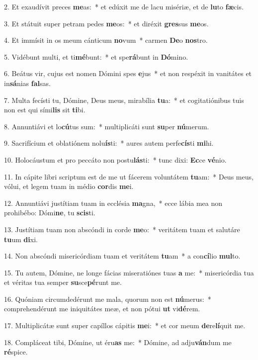 2. Et exaudívit preces \textbf{me}as:~*  et edúxit me de lacu misériæ, et de \textbf{lu}to \textbf{fæ}cis.\

3. Et státuit super petram pedes \textbf{me}os:~*  et diréxit \textbf{gres}sus \textbf{me}os.\

4. Et immísit in os meum cánticum \textbf{no}vum~*  carmen \textbf{De}o \textbf{nos}tro.\

5. Vidébunt multi, et ti\textbf{mé}bunt:~*  et spe\textbf{rá}bunt in \textbf{Dó}mino.\

6. Beátus vir, cujus est nomen Dómini spes \textbf{e}jus~*  et non respéxit in vanitátes et in\textbf{sá}nias \textbf{fal}sas.\

7. Multa fecísti tu, Dómine, Deus meus, mirabília \textbf{tu}a:~*  et cogitatiónibus tuis non est qui sími\textbf{lis} sit \textbf{ti}bi.\

8. Annuntiávi et lo\textbf{cú}tus sum:~*  multiplicáti sunt \textbf{su}per \textbf{nú}merum.\

9. Sacrifícium et oblatiónem nolu\textbf{ís}ti:~*  aures autem perfe\textbf{cís}ti \textbf{mi}hi.\

10. Holocáustum et pro peccáto non postu\textbf{lás}ti:~*  tunc dixi: \textbf{Ec}ce \textbf{vé}nio.\

11. In cápite libri scriptum est de me ut fácerem voluntátem \textbf{tu}am:~*  Deus meus, vólui, et legem tuam in médio \textbf{cor}dis \textbf{me}i.\

12. Annuntiávi justítiam tuam in ecclésia \textbf{ma}gna,~*  ecce lábia mea non prohibébo: Dómi\textbf{ne}, tu \textbf{scis}ti.\

13. Justítiam tuam non abscóndi in corde \textbf{me}o:~*  veritátem tuam et salutáre \textbf{tu}um \textbf{di}xi.\

14. Non abscóndi misericórdiam tuam et veritátem \textbf{tu}am~*  a con\textbf{cí}lio \textbf{mul}to.\

15. Tu autem, Dómine, ne longe fácias miseratiónes tuas \textbf{a} me:~*  misericórdia tua et véritas tua semper \textbf{su}sce\textbf{pé}runt me.\

16. Quóniam circumdedérunt me mala, quorum non est \textbf{nú}merus:~*  comprehendérunt me iniquitátes meæ, et non pótui \textbf{ut} vi\textbf{dé}rem.\

17. Multiplicátæ sunt super capíllos cápitis \textbf{me}i:~*  et cor meum \textbf{de}re\textbf{lí}quit me.\

18. Compláceat tibi, Dómine, ut éru\textbf{as} me:~*  Dómine, ad adju\textbf{ván}dum me \textbf{ré}spice.\


